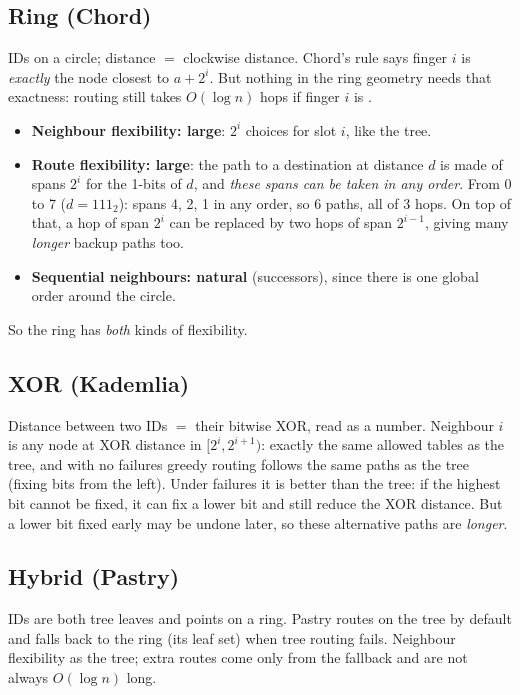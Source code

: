 \subsection{Ring (Chord)}
IDs on a circle; distance $=$ clockwise distance. Chord's rule says finger $i$ is \emph{exactly} the node closest to $a + 2^i$. But nothing in the ring
geometry needs that exactness: routing still takes $O(\log n)$ hops if finger $i$ is \key{any node in $[a + 2^i, a + 2^{i+1})$}.
\begin{itemize}
  \item \textbf{Neighbour flexibility: large}: $2^i$ choices for slot $i$, like the tree.
  \item \textbf{Route flexibility: large}: the path to a destination at distance $d$ is made of spans $2^i$ for the 1-bits of $d$, and \emph{these spans can be taken in
        any order}. From 0 to 7 ($d = 111_2$): spans 4, 2, 1 in any order, so 6 paths, all of 3 hops. On top of that, a hop of span $2^i$ can be replaced by two hops
        of span $2^{i-1}$, giving many \emph{longer} backup paths too.
  \item \textbf{Sequential neighbours: natural} (successors), since there is one global order around the circle.
\end{itemize}
So the ring has \emph{both} kinds of flexibility.

\subsection{XOR (Kademlia)}
Distance between two IDs $=$ their bitwise XOR, read as a number. Neighbour $i$ is any node at XOR distance in $[2^i, 2^{i+1})$: exactly the same allowed tables as the
tree, and with no failures greedy routing follows the same paths as the tree (fixing bits from the left). Under failures it is better than the tree: if the
highest bit cannot be fixed, it can fix a lower bit and still reduce the XOR distance. But a lower bit fixed early may be undone later, so these alternative
paths are \emph{longer}.

\subsection{Hybrid (Pastry)}
IDs are both tree leaves and points on a ring. Pastry routes on the tree by default and falls back to the ring (its leaf set) when tree routing fails. Neighbour
flexibility as the tree; extra routes come only from the fallback and are not always $O(\log n)$ long.

